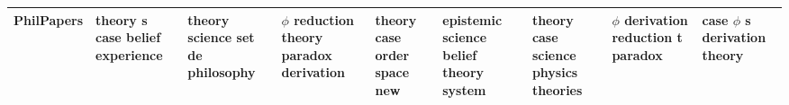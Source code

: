 \documentclass[11pt,a4paper]{article}
\begin{document}
\begin{appendices}
\begin{table}[htb]
\begin{tiny}
\begin{tabular}{|p{}|p{}|p{}|p{}|p{}|p{}|p{}|p{}|p{}|}
    PhilPapers & theory \newline s \newline case \newline belief \newline experience & theory \newline science \newline set \newline de \newline philosophy & $\phi$ \newline reduction \newline theory \newline paradox \newline derivation & theory \newline case \newline order \newline space \newline new & epistemic \newline science \newline belief \newline theory \newline system & theory \newline case \newline science \newline physics \newline theories & $\phi$ \newline derivation \newline reduction \newline t \newline paradox & case \newline $\phi$ \newline s \newline derivation \newline theory\\\hline

\end{tabular}
\end{tiny}
\end{table}
\end{appendices}
\end{document}
